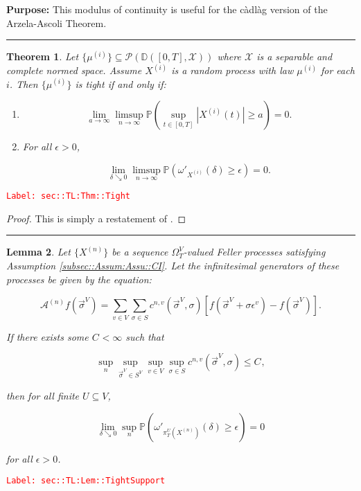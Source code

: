 \documentclass[12pt]{article}
\newcommand{\mb}{\mathbb}
\newcommand{\mc}{\mathcal}
\newcommand{\ra}{\rightarrow}
\newcommand{\ep}{\epsilon}
\newcommand{\tr}{\textcolor{red}}
\newcommand{\labe}[1]{\tr{\texttt{Label: #1}}}
\newcommand{\purpose}{\textbf{Purpose: }}
\newcommand{\lin}{\rule{\linewidth}{0.4 pt}}
\newcommand{\pr}{\mb{P}}							%
\newcommand{\cad}{\mb{D}}							%
\renewcommand{\v}{v}							%
\renewcommand{\U}{U}							%
\renewcommand{\S}{S}							%
\newcommand{\s}{\sigma}							%
\newcommand{\sv}{\vec{\s}}						%
\newcommand{\ev}{\ep}							%
\newcommand{\T}{T}								%
\renewcommand{\t}{t}							%
\newcommand{\sset}{\Omega}						%
\newcommand{\proj}{\pi}							%
\newcommand{\X}{X}								%
\newcommand{\IG}{\mc{A}}						%
\newcommand{\IGr}{c}							%
\newcommand{\vind}[1]{^{#1}}					%
\newcommand{\carp}[1]{^{#1}}					%
\newcommand{\vsi}[1]{^{#1}}						%
\newcommand{\cind}[1]{_{#1}}					%
\newcommand{\tp}[1]{(#1)}						%
\newcommand{\tip}[1]{#1}						%
\newcommand{\ts}[1]{_{#1}}						%
\newcommand{\slnvind}[2]{^{#1,#2}}				%
\newcommand{\const}{C}							%
\newcommand{\sln}[1]{^{(#1)}}					%
\newcommand{\cmodu}{\omega'}					%
\newcommand{\pra}[1]{_{#1}}						%
\newcommand{\indx}[1]{_{#1}}					%
\newcommand{\m}{\mu}							%
\newcommand{\spce}{\mc{X}}						%
\newtheorem{thms}{Theorem}[section]
\newtheorem{lem}[thms]{Lemma}
\begin{document}
\purpose This modulus of continuity is useful for the c\`adl\`ag version of the Arzela-Ascoli Theorem.

\lin

\begin{thms}
Let \(\{\m\sln{i}\}\subseteq \mc{P}\left(\cad([0,T],\spce)\right)\) where \(\spce\) is a separable and complete normed space. Assume \(\X\sln{i}\) is a random process with law \(\m\sln{i}\) for each \(i\). Then \(\{\m\sln{i}\}\) is tight if and only if:

\begin{enumerate}[(1)]
\item 

\[\lim_{a \ra \infty}\limsup_{n \ra\infty} \pr\left(\sup_{\t \in [0,T]} |\X\sln{i}\tp{\t}| \geq a\right) = 0.\]

\item For all \(\ep > 0\),

\[\lim_{\delta \searrow 0}\limsup_{n\ra\infty} \pr\left(\cmodu\pra{\X\sln{i}}(\delta) \geq \ep\right) = 0.\]
\end{enumerate}
\label{sec::TL:Thm::Tight}
\end{thms}
\labe{sec::TL:Thm::Tight}

\begin{proof}
This is simply a restatement of \cite[Theorem 13.2]{Bil99}.
\end{proof}

\lin

\begin{lem}
Let \(\{\X\sln{n}\cind{}\tip{}\}\) be a sequence \(\sset\vsi{V}\ts{\T}\)-valued Feller processes satisfying Assumption \ref{subsec::Assum:Assu::CI}. Let the infinitesimal generators of these processes be given by the equation:

\[\IG\sln{n}f(\sv\cind{}\vsi{V}) = \sum_{\v\in V}\sum_{\s \in \S} \IGr\slnvind{n}{\v}(\sv\cind{}\vsi{V},\s)[f(\sv\cind{}\vsi{V} + \s\ev\vind{\v}) - f(\sv\cind{}\vsi{V})].\]

If there exists some \(\const\indx{} < \infty\) such that

\[\sup_{n}\sup_{\sv\cind{}\vsi{V}\in \S\carp{V}}\sup_{\v\in V}\sup_{\s\in \S} \IGr\slnvind{n}{\v}(\sv\cind{}\vsi{V},\s) \leq \const\indx{},\]

then for all finite \(\U \subseteq V\),

\[\lim_{\delta \searrow 0} \sup_n \pr\left(\cmodu\pra{\proj\vsi{\U}\ts{\T}\left(\X\sln{n}\cind{}\tip{}\right)}(\delta) \geq \ep\right) = 0\]

for all \(\ep > 0\).
\label{sec::TL:Lem::TightSupport}
\end{lem}
\labe{sec::TL:Lem::TightSupport}
\end{document}
